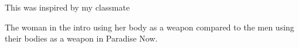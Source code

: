 \documentclass{article}
\begin{document}
This was inspired by my classmate 

The woman in the intro using her body as a weapon compared to the men using their bodies as a weapon in Paradise Now.
\end{document}
